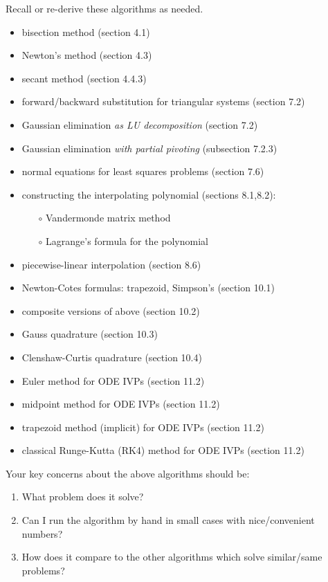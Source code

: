 \documentclass[12pt]{amsart}
\begin{document}
  Recall or re-derive these algorithms as needed.
  \begin{itemize}
  \item  bisection method (section 4.1)
  \item  Newton's method (section 4.3)
  \item  secant method (section 4.4.3)
  \item  forward/backward substitution for triangular systems (section 7.2)
  \item  Gaussian elimination \emph{as LU decomposition} (section 7.2)
  \item  Gaussian elimination \emph{with partial pivoting} (subsection 7.2.3)
  \item  normal equations for least squares problems (section 7.6)
  \item  constructing the interpolating polynomial (sections 8.1,8.2):
    \begin{itemize}
    \item[$\circ$] Vandermonde matrix method
    \item[$\circ$] Lagrange's formula for the polynomial
    \end{itemize}
  \item piecewise-linear interpolation (section 8.6)
  \item Newton-Cotes formulas: trapezoid, Simpson's (section 10.1)
  \item composite versions of above (section 10.2)
  \item Gauss quadrature (section 10.3)
  \item Clenshaw-Curtis quadrature (section 10.4)
  \item Euler method for ODE IVPs (section 11.2)
  \item midpoint method for ODE IVPs (section 11.2)
  \item trapezoid method (implicit) for ODE IVPs (section 11.2)
  \item classical Runge-Kutta (RK4) method for ODE IVPs (section 11.2)
  \end{itemize}

\newpage
{}  Your key concerns about the above algorithms should be:
\begin{enumerate}
\item What problem does it solve?
\item Can I run the algorithm by hand in small cases with nice/convenient numbers?
\item How does it compare to the other algorithms which solve similar/same problems?
\end{enumerate}
\end{document}
